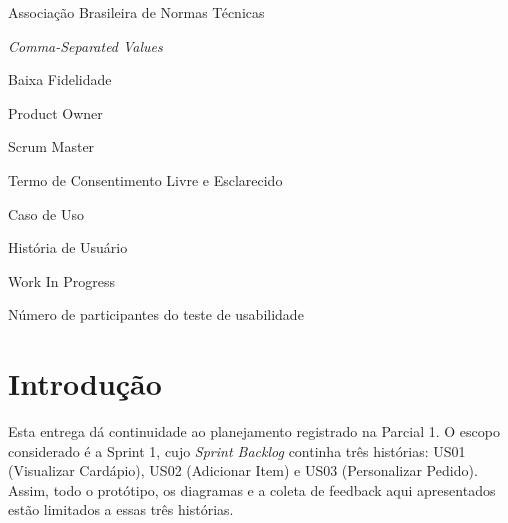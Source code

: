 \documentclass[12pt, oneside, a4paper, chapter=TITLE,section=TITLE]{abntex2}
\begin{document}
\frenchspacing

\pretextual
\imprimircapa %
\imprimirfolhaderosto %

 \listoffigures*
\cleardoublepage

\listoftables*
\cleardoublepage

 \listofquadros*
\cleardoublepage

\begin{siglas}
  \item[ABNT] Associação Brasileira de Normas Técnicas
  \item[CSV] \textit{Comma-Separated Values}
  \item[LF] Baixa Fidelidade
  \item[PO] Product Owner
  \item[SM] Scrum Master
  \item[TCLE] Termo de Consentimento Livre e Esclarecido
  \item[UC] Caso de Uso
  \item[US] História de Usuário
  \item[WIP] Work In Progress
\end{siglas}

\begin{simbolos}
  \item[$N$] Número de participantes do teste de usabilidade
\end{simbolos}

\tableofcontents*

\textual

\chapter{Introdução}

Esta entrega dá continuidade ao planejamento registrado na Parcial 1. O escopo considerado é a Sprint 1, cujo \textit{Sprint Backlog} continha três histórias: US01 (Visualizar Cardápio), US02 (Adicionar Item) e US03 (Personalizar Pedido). Assim, todo o protótipo, os diagramas e a coleta de feedback aqui apresentados estão limitados a essas três histórias.
\end{document}
